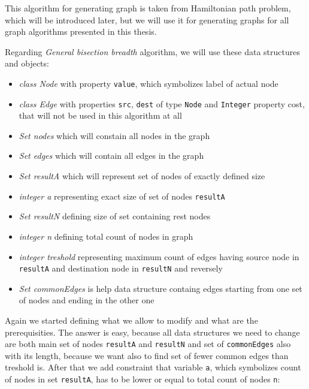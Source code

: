 \documentclass[11pt,twoside,a4paper]{book}
\begin{document}
This algorithm for generating graph is taken from Hamiltonian path problem,
which will be introduced later, but we will use it for generating graphs for all
graph algorithms presented in this thesis.

Regarding \textit{General bisection breadth} algorithm, we will use these data
structures and objects:

\begin{itemize}
  \item \textit{class Node} with property \verb|value|, which symbolizes label
  of actual node
  \item \textit{class Edge} with properties \verb|src|, \verb|dest| of type
  \verb|Node| and \verb|Integer| property cost, that will not be used in this
  algorithm at all
  \item \textit{Set nodes} which will constain all nodes in the graph
  \item \textit{Set edges} which will contain all edges in the graph
  \item \textit{Set resultA} which will represent set of nodes of exactly
  defined size
  \item \textit{integer a} representing exact size of set of nodes
  \verb|resultA|
  \item \textit{Set resultN} defining size of set containing rest nodes
  \item \textit{integer n} defining total count of nodes in graph 
  \item \textit{integer treshold} representing maximum
  count of edges having source node in \verb|resultA| and destination node in \verb|resultN| and
  reversely
  \item \textit{Set commonEdges} is help data structure containg edges starting
  from one set of nodes and ending in the other one
\end{itemize}

Again we started defining what we allow to modify and what are the
prerequisities. The answer is easy, because all data structures we need to
change are both main set of nodes \verb|resultA| and \verb|resultN| and set of
\verb|commonEdges| also with its length, because we want also to find set of
fewer common edges than treshold is. After that we add constraint that
variable \verb|a|, which symbolizes count of nodes in set \verb|resultA|, has
to be lower or equal to total count of nodes \verb|n|:



\end{document}
